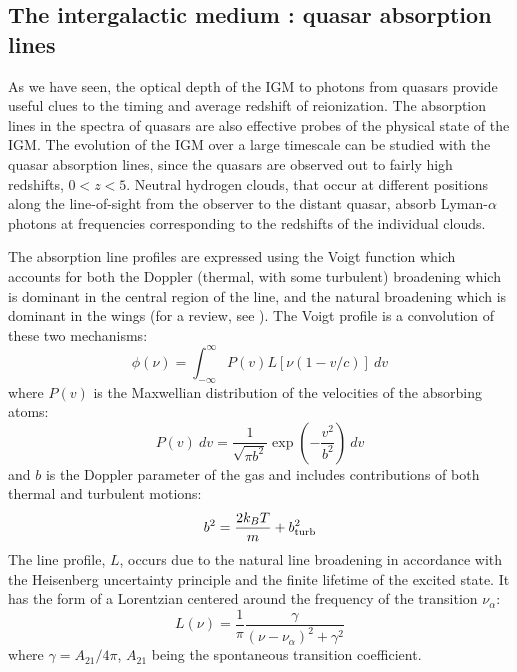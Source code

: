 \subsection{The intergalactic medium : quasar absorption lines}
\label{sec:igm}

As we have seen, the optical depth of the IGM to photons from quasars provide useful clues to the timing and average redshift of reionization. The absorption lines in the spectra of quasars are also effective probes of the physical state of the IGM. The evolution of the IGM over a large timescale can be studied with the quasar absorption lines, since the quasars are observed out to fairly high redshifts, $0 < z < 5$.
 Neutral hydrogen clouds, that occur at different positions along the line-of-sight from the observer to the distant quasar, absorb Lyman-$\alpha$ photons at frequencies corresponding to the redshifts of the individual clouds. 

The absorption line profiles are expressed using the Voigt function which accounts for both the Doppler (thermal, with some turbulent) broadening which is dominant in the central region of the line, and the natural broadening which is dominant in the wings (for a review, see \cite{djikstra2014}). The Voigt profile is a convolution of these two mechanisms:
\begin{equation}
 \phi(\nu) = \int_{-\infty}^{\infty} P(v) L[\nu(1 - v/c)] \ d v
\end{equation} 
where $P(v)$ is the Maxwellian distribution of the velocities of the absorbing atoms:
\begin{equation}
P(v) \ dv = \frac{1}{\sqrt{\pi b^2}} \exp\left(-\frac{v^2}{b^2}\right) \ dv
\end{equation} 
and $b$ is the Doppler parameter of the gas and includes contributions of both thermal and turbulent motions:
\begin{equation}
 b^2 = \frac{2 k_B T}{m} + b_{\rm turb}^2
\end{equation} 
The line profile, $L$, occurs due to the natural line broadening in accordance with the Heisenberg uncertainty principle and the finite lifetime of the excited state. It has the form of a Lorentzian centered around the frequency of the transition $\nu_{\alpha}$:
\begin{equation}
 L(\nu) = \frac{1}{\pi} \frac{\gamma}{(\nu - \nu_{\alpha})^2 + \gamma^2}
\end{equation} 
where $\gamma = A_{21}/4\pi$, $A_{21}$ being the spontaneous transition coefficient. 

